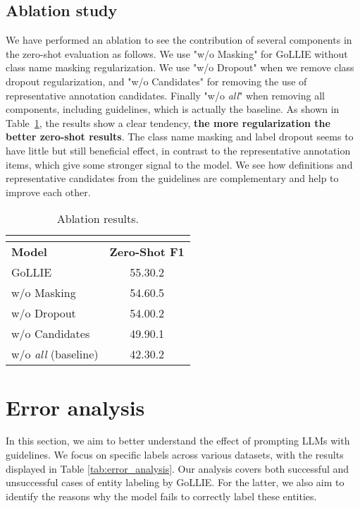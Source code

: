 \documentclass{article} \usepackage{iclr2024_conference,times}
\newcommand{\GoLLIE}{\scalerel*{\texttt{[image: logo/GoLLIE.pdf]}}{\textrm{\textbigcircle}} }
\newcommand{\GoLLIET}{\scalerel*{\texttt{[image: logo/GoLLIE.pdf]}}{\textrm{\textbigcircle}} GoLLIE}
\begin{document}
\subsection{Ablation study}
\label{sec:Ablation}

We have performed an ablation to see the contribution of several components in the zero-shot evaluation as follows. We use "w/o Masking"  for \GoLLIE GoLLIE without class name masking regularization. We use "w/o Dropout" when we remove class dropout regularization, and "w/o Candidates" for removing the use of representative annotation candidates. Finally "w/o \textit{all}" when removing all components, including  guidelines, which is actually the baseline. As shown in Table~\ref{tab:ablation}, the results show a clear tendency, \textbf{the more regularization the better zero-shot results}. 
The class name masking and label dropout seems to have little but still beneficial effect, in contrast to the representative annotation items, which give some stronger signal to the model. We see how definitions and representative candidates from the guidelines are complementary and help to improve each other.

\begin{table}[htb]
    \centering
    \caption{Ablation results.}
    \begin{tabular}{l|c}
        \multicolumn{2}{c}{} \\
        \toprule
        \textbf{Model} & \textbf{Zero-Shot F1} \\
        \midrule
        \GoLLIET & 55.3\tiny{0.2} \\
        \midrule
        w/o Masking & 54.6\tiny{0.5} \\
        w/o Dropout & 54.0\tiny{0.2} \\
        w/o Candidates & 49.9\tiny{0.1} \\
        w/o \textit{all} (baseline) & 42.3\tiny{0.2} \\
        \bottomrule
    \end{tabular}
    \label{tab:ablation}

\end{table}





\section{Error analysis} 

In this section, we aim to better understand the effect of prompting LLMs with guidelines. We focus on specific labels across various datasets, with the results displayed in Table \ref{tab:error_analysis}. Our analysis covers both successful and unsuccessful cases of entity labeling by GoLLIE. For the latter, we also aim to identify the reasons why the model fails to correctly label these entities.
\end{document}
